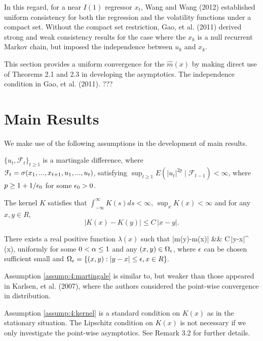 In this regard, for a near $I(1)$ regressor $x_t$, Wang and Wang (2012) established uniform consistency for  both the regression and the volatility functions under  a compact set. Without the compact set restriction,  Gao, et al. (2011) derived strong and weak consistency results for the case where the $x_k$ is a null recurrent Markov chain,  but  imposed the independence between $u_k$ and $x_k$. 

This section provides a uniform convergence for the  $\hat{m}(x)$ by making direct use of Theorems 2.1 and 2.3 in developing the asymptotics. The independence condition in Gao, et al. (2011).  ???



\section{Main Results}
We make use of the following assumptions in the development of main results.

\begin{assump} 
 $\{u_t, {\mathcal F}_t\}_{t\ge 1}$ is a martingale difference, where\\ ${\mathcal F}_t=\sigma (x_1, ..., x_{t+1}, u_1,...,u_t)$, satisfying $ \sup_{t\ge 1}E(|u_t|^{2p}\mid {\mathcal F}_{t-1})<\infty$, where  $p\ge 1+1/\epsilon_0$ for some $\epsilon_0>0$.
 \end{assump}

\begin{assump} 
The kernel $K$ satisfies that $\int_{-\infty}^{\infty}K(s)ds<\infty$, $\sup_xK(x)<\infty$
 and for any $x, y \in R$, $$ |K(x)-K(y)| \le C\, |x-y|. $$
\end{assump}

\begin{assump} 
There exists a real positive function $\lambda(x)$ such that
\bestar
|m(y)-m(x)| &\leq& C\,|y-x|^{\alpha} \lambda(x),
\eestar
uniformly for some $0<\alpha\le 1$ and  any  $(x, y)\in \Omega_\epsilon$, where $\epsilon$ can be chosen sufficient small and $ \Omega_{\epsilon} = \{(x,y): |y-x|\le \epsilon, x\in R\}. $
\end{assump}


\vskip 0.3cm
Assumption \ref{assump:4:martingale} is similar to, but weaker than  those appeared in Karlsen, et al. (2007), where  the authors considered the point-wise convergence in distribution.

Assumption \ref{assump:4:kernel} is a standard condition on $K(x)$  as in the stationary
situation. The Lipschitz condition on $K(x)$ is not necessary if we
only investigate the point-wise asymptotics. See Remark 3.2 for
further details.

